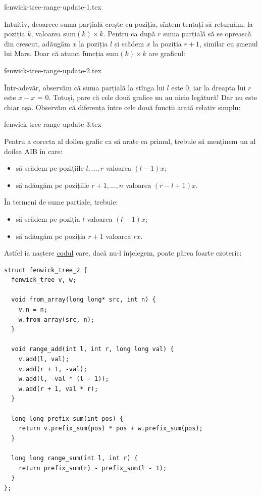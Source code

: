 \documentclass[../main.tex]{subfiles}
\begin{document}
{fenwick-tree-range-update-1.tex}

Intuitiv, deoarece suma parțială crește cu poziția, sîntem tentați să returnăm, la poziția $k$, valoarea $\mathrm{sum}(k) \times k$. Pentru ca după $r$ suma parțială să se oprească din crescut, adăugăm $x$ la poziția $l$ și scădem $x$ la poziția $r + 1$, similar cu șmenul lui Mars. Doar că atunci funcția $\mathrm{sum}(k) \times k$ are graficul:

{fenwick-tree-range-update-2.tex}

Într-adevăr, observăm că suma parțială la stînga lui $l$ este 0, iar la dreapta lui $r$ este $x - x$ = 0. Totuși, pare că cele două grafice nu au nicio legătură! Dar nu este chiar așa. Observăm că diferența între cele două funcții arată relativ simplu:

{fenwick-tree-range-update-3.tex}

Pentru a corecta al doilea grafic ca să arate ca primul, trebuie să menținem un al doilea AIB în care:

\begin{itemize}
  \item să scădem pe pozițiile $l, \dots, r$ valoarea $(l-1)x$;
  \item să adăugăm pe pozițiile $r+1, \dots, n$ valoarea $(r-l+1)x$.
\end{itemize}

În termeni de sume parțiale, trebuie:

\begin{itemize}
  \item să scădem pe poziția $l$ valoarea $(l-1)x$;
  \item să adăugăm pe poziția $r+1$ valoarea $rx$.
\end{itemize}

Astfel ia naștere \href{https://github.com/CatalinFrancu/nerdvana/blob/main/query-update/range-range/fenwick.cpp}{codul} care, dacă nu-l înțelegem, poate părea foarte ezoteric:

\begin{verbatim}
struct fenwick_tree_2 {
  fenwick_tree v, w;

  void from_array(long long* src, int n) {
    v.n = n;
    w.from_array(src, n);
  }

  void range_add(int l, int r, long long val) {
    v.add(l, val);
    v.add(r + 1, -val);
    w.add(l, -val * (l - 1));
    w.add(r + 1, val * r);
  }

  long long prefix_sum(int pos) {
    return v.prefix_sum(pos) * pos + w.prefix_sum(pos);
  }

  long long range_sum(int l, int r) {
    return prefix_sum(r) - prefix_sum(l - 1);
  }
};
\end{verbatim}
\end{document}
